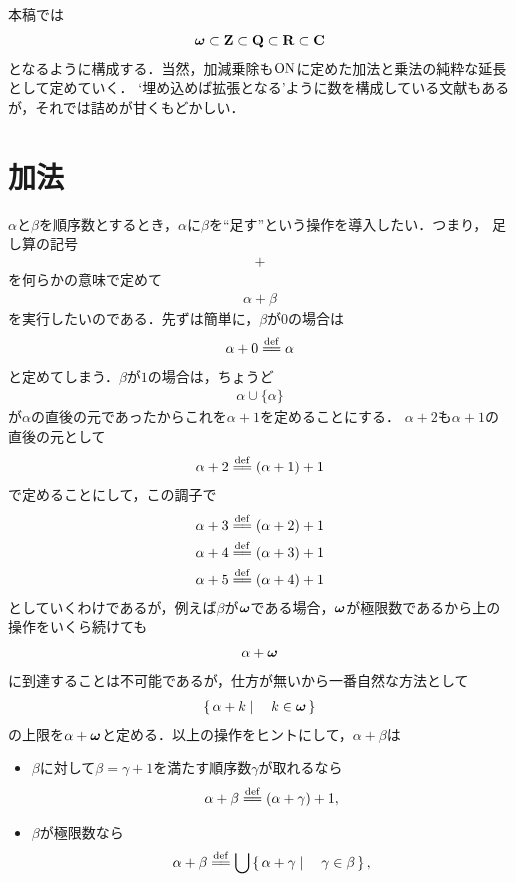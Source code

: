 本稿では
\begin{align}
	{\boldsymbol \omega} \subset \mathbf{Z} \subset \mathbf{Q} \subset \mathbf{R} \subset \mathbf{C}
\end{align}
となるように構成する．当然，加減乗除も$\mathrm{ON}$に定めた加法と乗法の純粋な延長として定めていく．
`埋め込めば拡張となる'ように数を構成している文献もあるが，それでは詰めが甘くもどかしい．

\section{加法}
	$\alpha$と$\beta$を順序数とするとき，$\alpha$に$\beta$を``足す''という操作を導入したい．つまり，
	足し算の記号
	\begin{align}
		+
	\end{align}
	を何らかの意味で定めて
	\begin{align}
		\alpha + \beta
	\end{align}
	を実行したいのである．先ずは簡単に，$\beta$が$0$の場合は
	\begin{align}
		\alpha + 0 \defeq \alpha
	\end{align}
	と定めてしまう．$\beta$が$1$の場合は，ちょうど
	\begin{align}
		\alpha \cup \{\alpha\}
	\end{align}
	が$\alpha$の直後の元であったからこれを$\alpha + 1$を定めることにする．
	$\alpha + 2$も$\alpha + 1$の直後の元として
	\begin{align}
		\alpha + 2 \defeq (\alpha + 1) + 1
	\end{align}
	で定めることにして，この調子で
	\begin{align}
		&\alpha + 3 \defeq (\alpha + 2) + 1 \\
		&\alpha + 4 \defeq (\alpha + 3) + 1 \\
		&\alpha + 5 \defeq (\alpha + 4) + 1
	\end{align}
	としていくわけであるが，例えば$\beta$が${\boldsymbol \omega}$である場合，${\boldsymbol \omega}$が極限数であるから上の操作をいくら続けても
	\begin{align}
		\alpha + {\boldsymbol \omega}
	\end{align}
	に到達することは不可能であるが，仕方が無いから一番自然な方法として
	\begin{align}
		\left\{\, \alpha + k \mid \quad k \in {\boldsymbol \omega}\, \right\}
	\end{align}
	の上限を$\alpha + {\boldsymbol \omega}$と定める．以上の操作をヒントにして，$\alpha + \beta$は
	\begin{itemize}
		\item $\beta$に対して$\beta = \gamma + 1$を満たす順序数$\gamma$が取れるなら
			\begin{align}
				\alpha + \beta \defeq (\alpha + \gamma) + 1,
			\end{align}
		
		\item $\beta$が極限数なら
			\begin{align}
				\alpha + \beta \defeq \bigcup \Set{\alpha + \gamma}{\gamma \in \beta},
			\end{align}
	\end{itemize}
